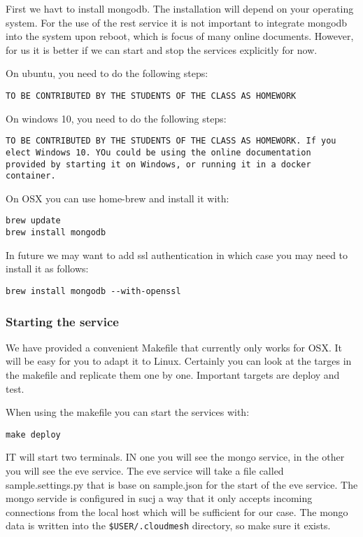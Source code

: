 First we havt to install mongodb. The installation will depend on your
operating system. For the use of the rest service it is not important to
integrate mongodb into the system upon reboot, which is focus of many
online documents. However, for us it is better if we can start and stop
the services explicitly for now.

On ubuntu, you need to do the following steps:

\begin{verbatim}
TO BE CONTRIBUTED BY THE STUDENTS OF THE CLASS AS HOMEWORK
\end{verbatim}

On windows 10, you need to do the following steps:

\begin{verbatim}
TO BE CONTRIBUTED BY THE STUDENTS OF THE CLASS AS HOMEWORK. If you
elect Windows 10. YOu could be using the online documentation
provided by starting it on Windows, or running it in a docker container.
\end{verbatim}

On OSX you can use home-brew and install it with:

\begin{verbatim}
brew update
brew install mongodb
\end{verbatim}

In future we may want to add ssl authentication in which case you
may
need to install it as follows:

\begin{verbatim}
brew install mongodb --with-openssl
\end{verbatim}

\subsubsection{Starting the service}\label{starting-the-service}

We have provided a convenient Makefile that currently only works for
OSX. It will be easy for you to adapt it to Linux. Certainly you can
look at the targes in the makefile and replicate them one by one.
Important targets are deploy and test.

When using the makefile you can start the services with:

\begin{verbatim}
make deploy
\end{verbatim}

IT will start two terminals. IN one you will see the mongo service, in
the other you will see the eve service. The eve service will take a file
called sample.settings.py that is base on sample.json for the start of
the eve service. The mongo servide is configured in sucj a way that it
only accepts incoming connections from the local host which will be
sufficient for our case. The mongo data is written into the
\verb|$USER/.cloudmesh| directory, so make sure it exists.

